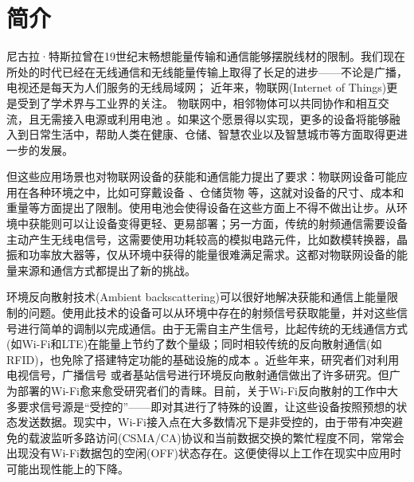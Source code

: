 
\chapter{简介}
\label{chap:introduction}

尼古拉·特斯拉曾在19世纪末畅想能量传输和通信能够摆脱线材的限制。我们现在所处的时代已经在无线通信和无线能量传输上取得了长足的进步——不论是广播，电视还是每天为人们服务的无线局域网；
近年来，物联网(Internet of Things)更是受到了学术界与工业界的关注。
物联网中，相邻物体可以共同协作和相互交流，且无需接入电源或利用电池\cite{gershenfeld2004internet}
。如果这个愿景得以实现，更多的设备将能够融入到日常生活中，帮助人类在健康、仓储、智慧农业以及智慧城市等方面取得更进一步的发展。

但这些应用场景也对物联网设备的获能和通信能力提出了要求：物联网设备可能应用在各种环境之中，比如可穿戴设备\cite{baker2017internet}
、仓储货物\cite{lee2018design}
等，这就对设备的尺寸、成本和重量等方面提出了限制。使用电池会使得设备在这些方面上不得不做出让步。从环境中获能则可以让设备变得更轻、更易部署；另一方面，传统的射频通信需要设备主动产生无线电信号，这需要使用功耗较高的模拟电路元件，比如数模转换器，晶振和功率放大器等，仅从环境中获得的能量很难满足需求。这都对物联网设备的能量来源和通信方式都提出了新的挑战。

环境反向散射技术(Ambient backscattering)可以很好地解决获能和通信上能量限制的问题。使用此技术的设备可以从环境中存在的射频信号获取能量，并对这些信号进行简单的调制以完成通信。由于无需自主产生信号，比起传统的无线通信方式(如Wi-Fi和LTE)在能量上节约了数个量级；同时相较传统的反向散射通信(如RFID)，也免除了搭建特定功能的基础设施的成本\cite{liu2013ambient}
。近些年来，研究者们对利用电视信号\cite{liu2013ambient}，广播信号\cite{wang2017fm}
或者基站信号\cite{parks2014sifting}进行环境反向散射通信做出了许多研究。但广为部署的Wi-Fi愈来愈受研究者们的青睐。目前，关于Wi-Fi反向散射的工作中大多要求信号源是“受控的”——即对其进行了特殊的设置，让这些设备按照预想的状态发送数据。现实中，Wi-Fi接入点在大多数情况下是非受控的，由于带有冲突避免的载波监听多路访问(CSMA/CA)协议和当前数据交换的繁忙程度不同，常常会出现没有Wi-Fi数据包的空闲(OFF)状态存在。这便使得以上工作在现实中应用时可能出现性能上的下降。

